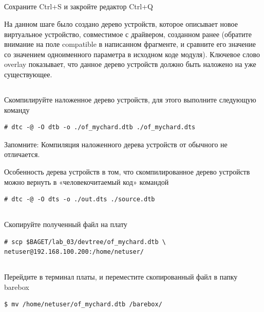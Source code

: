 \subsection{} Сохраните Ctrl+S и закройте редактор Ctrl+Q

На данном шаге было создано дерево устройств, которое описывает новое виртуальное устройство, совместимое с драйвером, созданном ранее (обратите внимание на поле compatible в написанном фрагменте, и сравните его значение со значением одноименного параметра в исходном коде модуля). Ключевое слово overlay показывает, что данное дерево устройств должно быть наложено на уже существующее.  

\subsection{} Скомпилируйте наложенное дерево устройств, для этого выполните следующую команду 
\begin{lstlisting}[style=bash]
# dtc -@ -O dtb -o ./of_mychard.dtb ./of_mychard.dts
\end{lstlisting}

\begin{Notes}{Запомните:}
	Компиляция наложенного дерева устройств от обычного не отличается. 
\end{Notes}

\vspace{5mm}
Особенность дерева устройств в том, что скомпилированное дерево устройств можно вернуть в «человекочитаемый код» командой 
\begin{lstlisting}[style=bash]
# dtc -@ -O dts -o ./out.dts ./source.dtb
\end{lstlisting}

\subsection{}Скопируйте полученный файл на плату
\begin{lstlisting}[style=bash]
# scp $BAGET/lab_03/devtree/of_mychard.dtb \
netuser@192.168.100.200:/home/netuser/
\end{lstlisting}

\subsection{}Перейдите в терминал платы, и переместите скопированный файл в папку barebox
\begin{lstlisting}[style=bash]
$ mv /home/netuser/of_mychard.dtb /barebox/
\end{lstlisting}

